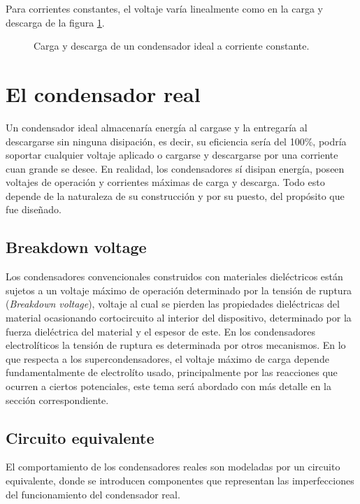 Para corrientes constantes, el voltaje varía linealmente como en la carga y descarga de la figura \ref{fig:plot:charge-discharge_ideal_cap}.
\begin{figure}[h!]
	\caption{Carga y descarga de un condensador ideal a corriente constante.}
	\label{fig:plot:charge-discharge_ideal_cap}
\end{figure}

\section{El condensador real}
Un condensador ideal almacenaría energía al cargase y la entregaría al descargarse sin ninguna disipación, es decir, su eficiencia sería del 100\%, podría soportar cualquier voltaje aplicado o cargarse y descargarse por una corriente cuan grande se desee.  En realidad, los condensadores sí disipan energía, poseen voltajes de operación y corrientes máximas de carga y descarga. Todo esto depende de la naturaleza de su construcción y por su puesto, del propósito que fue diseñado.

\subsection{Breakdown voltage}
Los condensadores convencionales construidos con materiales dieléctricos están sujetos a un voltaje máximo de operación determinado por la tensión de ruptura (\textit{Breakdown voltage}), voltaje al cual se pierden las propiedades dieléctricas del material ocasionando cortocircuito al interior del dispositivo, determinado por la fuerza dieléctrica del material y el espesor de este. En los condensadores electrolíticos la tensión de ruptura es determinada por otros mecanismos\cite{Yahalom1971}. En lo que respecta a los supercondensadores, el voltaje máximo de carga depende fundamentalmente de electrolíto usado, principalmente por las reacciones que ocurren a ciertos potenciales, este tema será abordado con más detalle en la sección correspondiente.

\subsection{Circuito equivalente}
El comportamiento de los condensadores reales son modeladas por un circuito equivalente, donde se introducen componentes que representan las imperfecciones del funcionamiento del condensador real.\\

